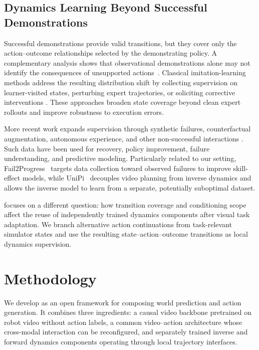 \subsection{Dynamics Learning Beyond Successful Demonstrations}

Successful demonstrations provide valid transitions, but they cover only the
action--outcome relationships selected by the demonstrating policy. A
complementary analysis shows that observational demonstrations alone may not
identify the consequences of unsupported actions~\cite{yu2026capability}.
Classical imitation-learning methods address the resulting distribution shift
by collecting supervision on learner-visited states, perturbing expert
trajectories, or soliciting corrective interventions
\cite{ross2011reduction,laskey2017dart,mandlekar2020human,hu2026rac,
intelligence2025pi}. These approaches broaden state coverage beyond clean
expert rollouts and improve robustness to execution errors.

More recent work expands supervision through synthetic failures,
counterfactual augmentation, autonomous experience, and other non-successful
interactions
\cite{ameperosa2025rocoda,duan2024aha,li2026learning,zhao2026flare,
yin2026playworld,peng2026fact,bi2026motus2,yang2026wam}.
Such data have been used for recovery, policy improvement, failure
understanding, and predictive modeling. Particularly related to our setting,
Fail2Progress~\cite{huang2025fail2progress} targets data collection toward
observed failures to improve skill-effect models, while
UniPi~\cite{du2023learning} decouples video planning from inverse dynamics and
allows the inverse model to learn from a separate, potentially suboptimal
dataset.

\ours focuses on a different question: how transition coverage and conditioning
scope affect the reuse of independently trained dynamics components after
visual task adaptation. We branch alternative action continuations from
task-relevant simulator states and use the resulting state--action--outcome
transitions as local dynamics supervision.

\section{Methodology}
\label{sec:method}

We develop \ours as an open framework for composing world prediction and
action generation. It combines three ingredients: a causal video backbone
pretrained on robot video without action labels, a common video--action
architecture whose cross-modal interaction can be reconfigured, and
separately trained inverse and forward dynamics components operating through
local trajectory interfaces.

